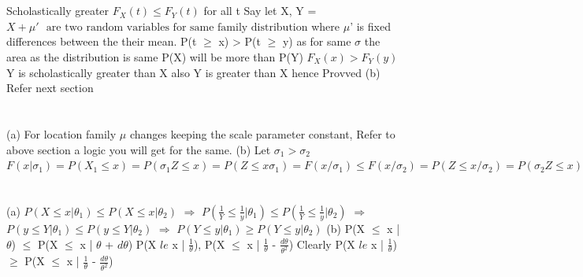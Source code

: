\documentclass{report}
\begin{document}
\section{}
Scholastically greater $F_X(t) \le F_Y(t)$ for all t
\newline
Say let X, Y = ${X + \mu'} \text{ } \text{are two random variables for same family distribution}$ where $\mu$' is fixed differences between the their mean.
P(t $\ge$ x) > P(t $\ge$ y) as for same $\sigma$ the area  as the distribution is same P(X) will be more than P(Y)
$F_X(x) > F_Y(y)$
\newline
Y is scholastically greater than X also Y is greater than X hence Provved
\newline
(b) Refer next section
\newline

\section{}
(a) For location family $\mu$ changes keeping the scale parameter constant, Refer to above section a logic you will get for the same.
\newline
(b) Let $\sigma_1 > \sigma_2$
\newline
$F(x|\sigma_1) = P(X_1 \le x) = P(\sigma_1Z \le x) = P(Z \le x\sigma_1) = F(x/\sigma_1) \le F(x/\sigma_2) = P(Z \le x/\sigma_2) = P(\sigma_2Z \le x) = P(X_2 \le x) = F(x | \sigma_2).$
\newline

\section{}
(a) $P( X \le x | \theta_1) \le P( X \le x | \theta_2)$
\newline
$\Rightarrow$ $P( \frac{1}{Y} \le \frac{1}{y} | \theta_1) \le P( \frac{1}{Y} \le \frac{1}{y} | \theta_2)$
\newline
$\Rightarrow$ $P( y \le Y | \theta_1) \le P( y \le Y | \theta_2)$
\newline
$\Rightarrow$ $P( Y \le y | \theta_1) \ge P( Y \le y | \theta_2)$
\newline
(b) P(X $\le$ x | $\theta$) $\le$ P(X $\le$ x | $\theta$ + $d\theta$)
\newline
P(X $le$ x | $\frac{1}{\theta}$), P(X $\le$ x | $\frac{1}{\theta}$ - $\frac{d\theta}{\theta^2}$)
\newline
Clearly P(X $le$ x | $\frac{1}{\theta}$)$\ge$ P(X $\le$ x | $\frac{1}{\theta}$ - $\frac{d\theta}{\theta^2}$)
\newline
\end{document}
